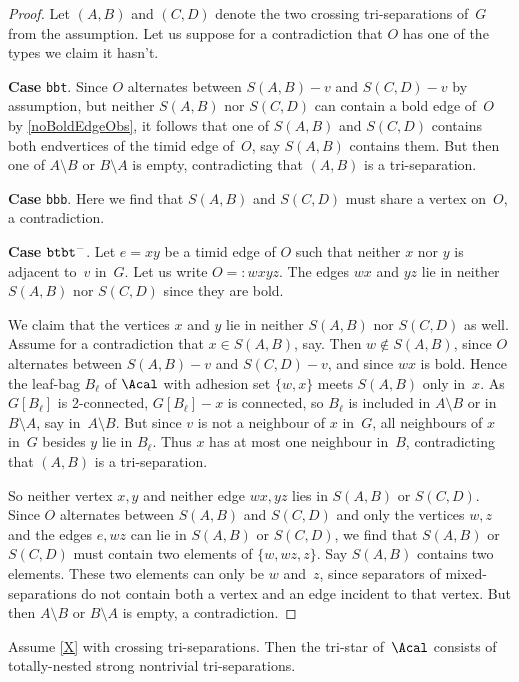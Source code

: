 \documentclass{aic}
\theoremstyle{plain}
\theoremstyle{definition}
\theoremstyle{plain}
\theoremstyle{plain}
\newcommand{\sm}{\setminus}
\newcommand{\ty}[1]{{\tt#1}}
\begin{document}
\begin{proof}
Let $(A,B)$ and $(C,D)$ denote the two crossing tri-separations of~$G$ from the assumption.
Let us suppose for a contradiction that $O$ has one of the types we claim it hasn't.

\textbf{Case} \ty{bbt}.
Since $O$ alternates between $S(A,B)-v$ and $S(C,D)-v$ by assumption, 
but neither $S(A,B)$ nor $S(C,D)$ can contain a bold edge of~$O$ by \autoref{noBoldEdgeObs}, it follows that one of $S(A,B)$ and $S(C,D)$ contains both endvertices of the timid edge of~$O$, say $S(A,B)$ contains them.
But then one of $A\sm B$ or $B\sm A$ is empty, contradicting that $(A,B)$ is a tri-separation.

\textbf{Case} \ty{bbb}. Here we find that $S(A,B)$ and $S(C,D)$ must share a vertex on~$O$, a contradiction.

\textbf{Case} $\ty{btbt}^-$.
Let $e=xy$ be a timid edge of $O$ such that neither $x$ nor $y$ is adjacent to~$v$ in~$G$.
Let us write $O=:wxyz$. 
The edges $wx$ and $yz$ lie in neither $S(A,B)$ nor $S(C,D)$ since they are bold.

We claim that the vertices $x$ and $y$ lie in neither $S(A,B)$ nor $S(C,D)$ as well.
Assume for a contradiction that $x\in S(A,B)$, say. 
Then $w\notin S(A,B)$, since $O$ alternates between $S(A,B)-v$ and $S(C,D)-v$, and since $wx$ is bold.
Hence the leaf-bag $B_\ell$ of $\Acal$ with adhesion set $\{w,x\}$ meets $S(A,B)$ only in~$x$. 
As $G[B_\ell]$ is 2-connected, $G[B_\ell]-x$ is connected, so $B_\ell$ is included in $A\sm B$ or in $B\sm A$, say in~$A\sm B$.
But since $v$ is not a neighbour of $x$ in~$G$, all neighbours of $x$ in~$G$ besides $y$ lie in $B_\ell$.
Thus $x$ has at most one neighbour in~$B$, contradicting that $(A,B)$ is a tri-separation.

So neither vertex $x,y$ and neither edge $wx,yz$ lies in $S(A,B)$ or $S(C,D)$.
Since $O$ alternates between $S(A,B)$ and $S(C,D)$ and only the vertices $w,z$ and the edges $e,wz$ can lie in $S(A,B)$ or $S(C,D)$, we find that $S(A,B)$ or $S(C,D)$ must contain two elements of $\{w,wz,z\}$.
Say $S(A,B)$ contains two elements.
These two elements can only be $w$ and~$z$, since separators of mixed-separations do not contain both a vertex and an edge incident to that vertex.
But then $A\sm B$ or $B\sm A$ is empty, a contradiction.
\end{proof}

\begin{prop}\label{is_splitting_star}
Assume \autoref{X} with crossing tri-separations. Then the tri-star of~$\Acal$ consists of totally-nested strong nontrivial tri-separations.
\end{prop}
\end{document}

